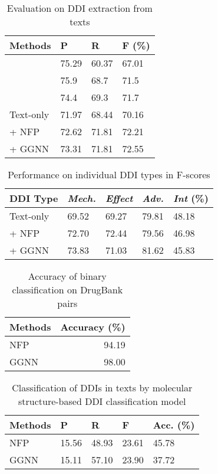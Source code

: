 \documentclass[11pt,a4paper]{article}
\begin{document}
\begin{table}[t!]
\centering
\begin{tabular}{p{3.5cm}lll} \hline
Methods & P & R & F (\%)\\\hline
\citet{liu2016drug} & 75.29 & 60.37 & 67.01\\
\citet{Zheng2017} & 75.9 & 68.7 & 71.5 \\
  \citet{lim2018drug} & 74.4 & 69.3 & 71.7\\\hline
Text-only  & 71.97 & 68.44 & 70.16\\
  + NFP & 72.62 & 71.81 & 72.21\\
  + GGNN & 73.31 & 71.81 & 72.55\\
  \hline
  \end{tabular}
  \caption{Evaluation on DDI extraction from texts}
  \label{table:comparison}
\end{table}

\begin{table}[t!]
\centering
\begin{tabular}{lllll} \hline
DDI Type & \textsl{Mech.} & \textsl{Effect} & \textsl{Adv.} & \textsl{Int} (\%)\\\hline
  Text-only & 69.52 & 69.27 & 79.81 & 48.18 \\
  + NFP & 72.70 & 72.44 & 79.56 & 46.98 \\
  + GGNN & 73.83 & 71.03 & 81.62 & 45.83 \\
  \hline
  \end{tabular}
  \caption{Performance on individual DDI types in F-scores}
  \label{table:type}
\end{table}

\begin{table}[t!]
  \centering
  \begin{tabular}{lr} \hline
  Methods & Accuracy (\%) \\\hline
  NFP &  94.19\\
  GGNN & 98.00 \\\hline
  \end{tabular}
  \caption{Accuracy of binary classification on DrugBank pairs}
   \label{table:bin}
\end{table}
\begin{table}[t!]
\centering
\begin{tabular}{lllll} \hline
Methods & P & R  & F & Acc. (\%)\\\hline
  NFP & 15.56 & 48.93 & 23.61 & 45.78\\
  GGNN & 15.11 & 57.10 & 23.90 & 37.72\\
  \hline
  \end{tabular}
  \caption{Classification of DDIs in texts by molecular structure-based DDI classification model}
  \label{table:detection}
\end{table}
\end{document}
